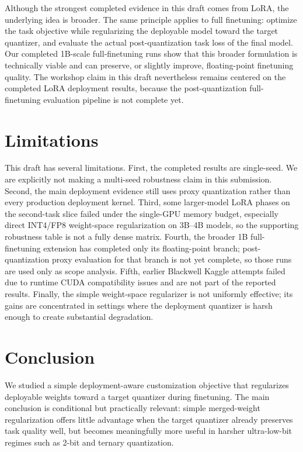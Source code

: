 \documentclass[11pt]{article}
\begin{document}
Although the strongest completed evidence in this draft comes from LoRA, the underlying idea is broader. The same principle applies to full finetuning: optimize the task objective while regularizing the deployable model toward the target quantizer, and evaluate the actual post-quantization task loss of the final model. Our completed 1B-scale full-finetuning runs show that this broader formulation is technically viable and can preserve, or slightly improve, floating-point finetuning quality. The workshop claim in this draft nevertheless remains centered on the completed LoRA deployment results, because the post-quantization full-finetuning evaluation pipeline is not complete yet.

\section{Limitations}

This draft has several limitations. First, the completed results are single-seed. We are explicitly not making a multi-seed robustness claim in this submission. Second, the main deployment evidence still uses proxy quantization rather than every production deployment kernel. Third, some larger-model LoRA phases on the second-task slice failed under the single-GPU memory budget, especially direct INT4/FP8 weight-space regularization on 3B--4B models, so the supporting robustness table is not a fully dense matrix. Fourth, the broader 1B full-finetuning extension has completed only its floating-point branch; post-quantization proxy evaluation for that branch is not yet complete, so those runs are used only as scope analysis. Fifth, earlier Blackwell Kaggle attempts failed due to runtime CUDA compatibility issues and are not part of the reported results. Finally, the simple weight-space regularizer is not uniformly effective; its gains are concentrated in settings where the deployment quantizer is harsh enough to create substantial degradation.

\section{Conclusion}

We studied a simple deployment-aware customization objective that regularizes deployable weights toward a target quantizer during finetuning. The main conclusion is conditional but practically relevant: simple merged-weight regularization offers little advantage when the target quantizer already preserves task quality well, but becomes meaningfully more useful in harsher ultra-low-bit regimes such as 2-bit and ternary quantization.
\end{document}

